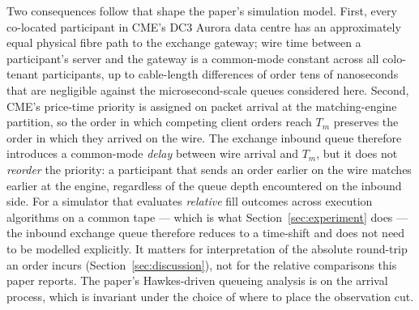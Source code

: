 \documentclass[11pt]{article}
\begin{document}
Two consequences follow that shape the paper's simulation model. First, every co-located participant in CME's DC3 Aurora data centre has an approximately equal physical fibre path to the exchange gateway; wire time between a participant's server and the gateway is a common-mode constant across all colo-tenant participants, up to cable-length differences of order tens of nanoseconds that are negligible against the microsecond-scale queues considered here. Second, CME's price-time priority is assigned on packet arrival at the matching-engine partition, so the order in which competing client orders reach $T_m$ preserves the order in which they arrived on the wire. The exchange inbound queue therefore introduces a common-mode \emph{delay} between wire arrival and $T_m$, but it does not \emph{reorder} the priority: a participant that sends an order earlier on the wire matches earlier at the engine, regardless of the queue depth encountered on the inbound side. For a simulator that evaluates \emph{relative} fill outcomes across execution algorithms on a common tape --- which is what Section~\ref{sec:experiment} does --- the inbound exchange queue therefore reduces to a time-shift and does not need to be modelled explicitly. It matters for interpretation of the absolute round-trip an order incurs (Section~\ref{sec:discussion}), not for the relative comparisons this paper reports. The paper's Hawkes-driven queueing analysis is on the arrival process, which is invariant under the choice of where to place the observation cut.
\end{document}

